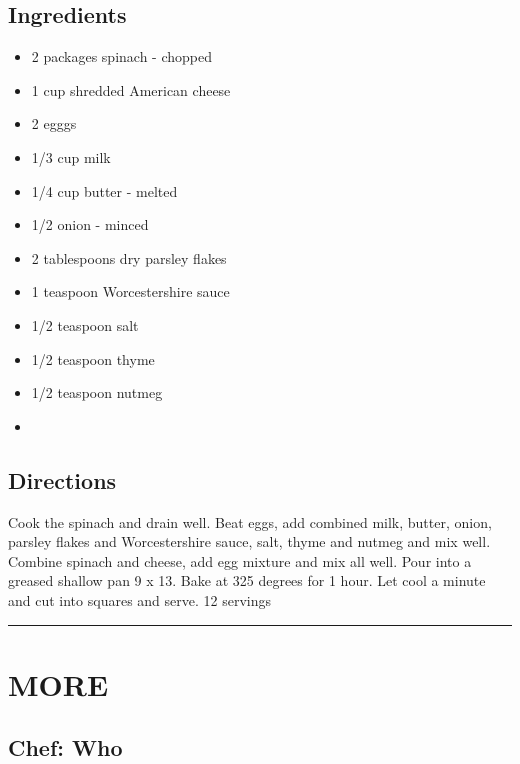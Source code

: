 \documentclass[
]{book}
\begin{document}
\hypertarget{ingredients-37}{%
\subsection*{Ingredients}\label{ingredients-37}}


\begin{itemize}
\item
  2 packages spinach - chopped
\item
  1 cup shredded American cheese
\item
  2 egggs
\item
  1/3 cup milk
\item
  1/4 cup butter - melted
\item
  1/2 onion - minced
\item
  2 tablespoons dry parsley flakes
\item
  1 teaspoon Worcestershire sauce
\item
  1/2 teaspoon salt
\item
  1/2 teaspoon thyme
\item
  1/2 teaspoon nutmeg
\item
\end{itemize}

\hypertarget{directions-37}{%
\subsection*{Directions}\label{directions-37}}


Cook the spinach and drain well. Beat eggs, add combined milk, butter,
onion, parsley flakes and Worcestershire sauce, salt, thyme and nutmeg
and mix well. Combine spinach and cheese, add egg mixture and mix all well.
Pour into a greased shallow pan 9 x 13. Bake at 325 degrees for 1 hour.
Let cool a minute and cut into squares and serve. 12 servings

\begin{center}\rule{0.5\linewidth}{0.5pt}\end{center}

\hypertarget{more-1}{%
\section*{MORE}\label{more-1}}


\hypertarget{chef-who-1}{%
\subsection*{Chef: Who}\label{chef-who-1}}
\end{document}
